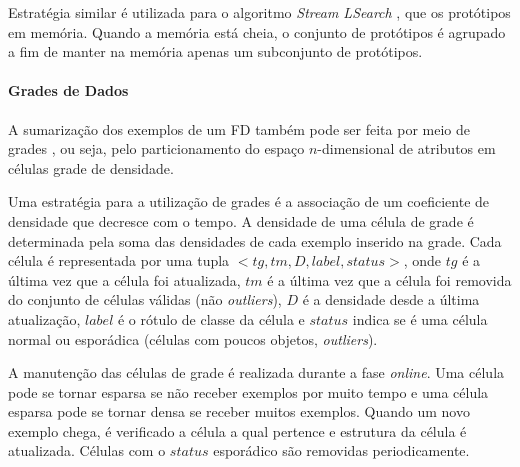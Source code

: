 Estratégia similar é utilizada para o algoritmo \emph{Stream LSearch} \cite{OCallaghan2002}, que os protótipos em memória. Quando a memória está cheia, o conjunto de protótipos é agrupado a fim de manter na memória apenas um subconjunto de protótipos.

\paragraph{Grades de Dados \\}

A sumarização dos exemplos de um FD também pode ser feita por meio de grades \cite{Cao2006,Chen2007,gama2011}, ou seja, pelo particionamento do espaço $n$-dimensional de atributos em células grade de densidade.

Uma estratégia \cite{Chen2007} para a utilização de grades é a associação de um coeficiente de densidade que decresce com o tempo. A densidade de uma célula de grade é determinada pela soma das densidades de cada exemplo inserido na grade. Cada célula é representada por uma tupla $<tg,tm,D,label,status>$, onde $tg$ é a última vez que a célula foi atualizada, $tm$ é a última vez que a célula foi removida do conjunto de células válidas (não \emph{outliers}), $D$ é a densidade desde a última atualização, $label$ é o rótulo de classe da célula e $status$ indica se é uma célula normal ou esporádica (células com poucos objetos, \emph{outliers}).

A manutenção das células de grade é realizada durante a fase \emph{online}. Uma célula pode se tornar esparsa se não receber exemplos por muito tempo e uma célula esparsa pode se tornar densa se receber muitos exemplos. Quando um novo exemplo chega, é verificado a célula a qual pertence e estrutura da célula é atualizada. Células com o $status$ esporádico são removidas periodicamente.